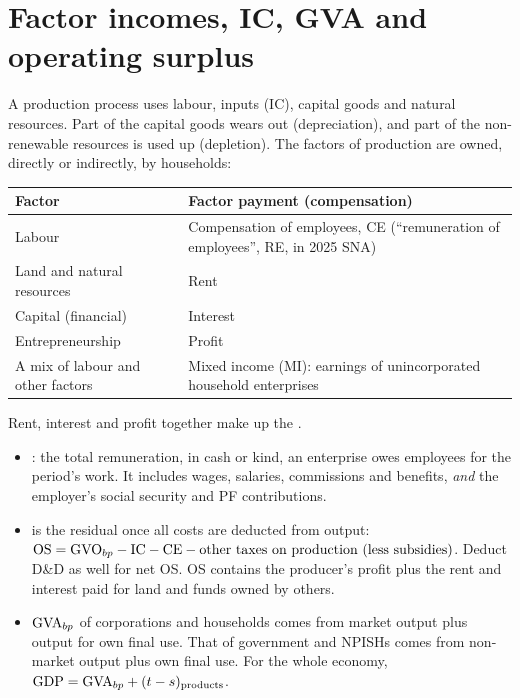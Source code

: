\section{Factor incomes, IC, GVA and operating surplus}\label{sec:os}

A production process uses labour, inputs (IC), capital goods and natural resources. Part of
the capital goods wears out (depreciation), and part of the non-renewable resources is used up
(depletion). The factors of production are owned, directly or indirectly, by households:

\begin{center}\small
\begin{tabularx}{0.92\textwidth}{@{}l X@{}}
\toprule
\textbf{Factor} & \textbf{Factor payment (compensation)} \\
\midrule
Labour & Compensation of employees, CE (``remuneration of employees'', RE, in 2025 SNA) \\
Land and natural resources & Rent \\
Capital (financial) & Interest \\
Entrepreneurship & Profit \\
A mix of labour and other factors & Mixed income (MI): earnings of unincorporated household enterprises \\
\bottomrule
\end{tabularx}
\end{center}

Rent, interest and profit together make up the .
\begin{itemize}
\item {}: the total remuneration, in cash or kind, an enterprise owes employees for the
  period's work. It includes wages, salaries, commissions and benefits, \emph{and} the employer's
  social security and PF contributions.
\item {} is the residual once all costs are deducted from output:
  $\mathrm{OS}=\mathrm{GVO}_{bp}-\mathrm{IC}-\mathrm{CE}-\text{other taxes on production (less subsidies)}$. Deduct
  D\&D as well for net OS. OS contains the producer's profit plus the rent and interest paid for
  land and funds owned by others.
\item $\mathrm{GVA}_{bp}$ of corporations and households comes from market output plus output for own
  final use. That of government and NPISHs comes from non-market output plus own final use. For
  the whole economy, $\mathrm{GDP}=\mathrm{GVA}_{bp}+(t-s)_{\text{products}}$.
\end{itemize}

